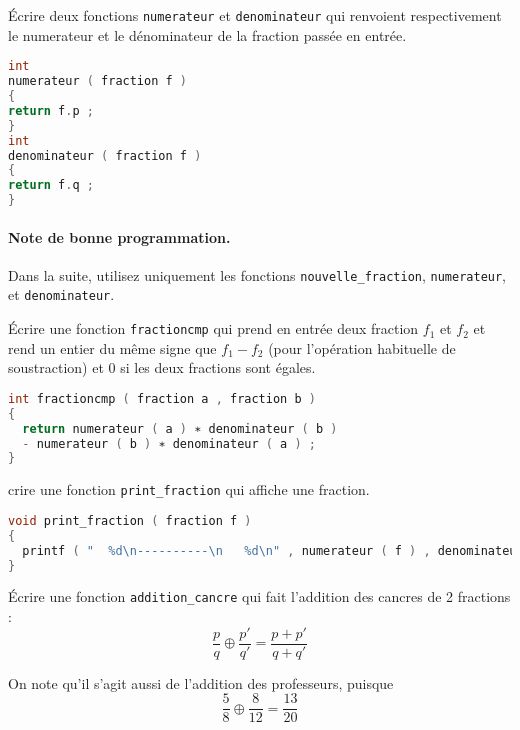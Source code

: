 \question Écrire deux fonctions \texttt{numerateur} et
\texttt{denominateur} qui renvoient respectivement le numerateur et le
dénominateur de la fraction passée en entrée.

\begin{solution}
  \begin{lstlisting}[language=C]
int
numerateur ( fraction f )
{
return f.p ;
}
int
denominateur ( fraction f )
{
return f.q ;
}
\end{lstlisting}
\end{solution}

\paragraph{Note de bonne programmation.} Dans la suite, utilisez
uniquement les fonctions \texttt{nouvelle\_fraction}, \texttt{numerateur}, et
\texttt{denominateur}.


\question Écrire une fonction \texttt{fractioncmp} qui prend en entrée
deux fraction \(f_1\) et \(f_2\) et rend un entier du même signe que
\(f_1 - f_2\) (pour l’opération habituelle de soustraction) et \(0\)
si les deux fractions sont égales.

\begin{solution}
  \begin{lstlisting}[language=C]
int fractioncmp ( fraction a , fraction b )
{
  return numerateur ( a ) ∗ denominateur ( b ) 
  - numerateur ( b ) ∗ denominateur ( a ) ;
}
\end{lstlisting}
\end{solution}


crire une fonction \texttt{print\_fraction} qui affiche une
fraction.
\begin{solution}
  \begin{lstlisting}[language=C]
void print_fraction ( fraction f )
{
  printf ( "  %d\n----------\n   %d\n" , numerateur ( f ) , denominateur ( f ) ) ;
}
\end{lstlisting}
\end{solution}


\question Écrire une fonction \texttt{addition\_cancre} qui fait
l’addition des cancres de 2 fractions :
\[
  \frac pq \oplus \frac{p'}{q'} = \frac{p+p'}{q+q'}
\]

On note qu’il s’agit aussi de l’addition des professeurs, puisque
\[
  \frac 58 \oplus \frac{8}{12} = \frac{13}{20}
\]

